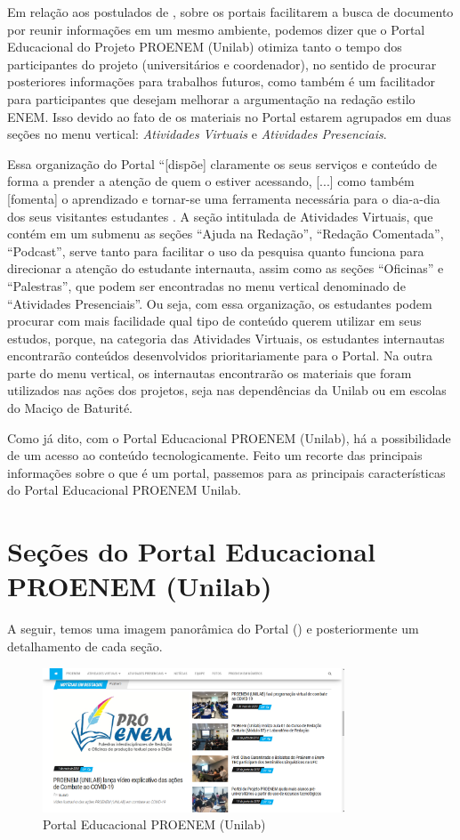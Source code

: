 \documentclass{textolivre}
\begin{document}
Em relação aos postulados de \textcite{bottentuitjunior2013}, sobre os portais facilitarem a busca de documento por reunir informações em um mesmo ambiente, podemos dizer que o Portal Educacional do Projeto PROENEM (Unilab) otimiza tanto o tempo dos participantes do projeto (universitários e coordenador), no sentido de procurar posteriores informações para trabalhos futuros, como também é um facilitador para participantes que desejam melhorar a argumentação na redação estilo ENEM. Isso devido ao fato de os materiais no Portal estarem agrupados em duas seções no menu vertical: \emph{Atividades Virtuais} e \emph{Atividades Presenciais}.

Essa organização do Portal “[dispõe] claramente os seus serviços e conteúdo de forma a prender a atenção de quem o estiver acessando, [...] como também [fomenta] o aprendizado e tornar-se uma ferramenta necessária para o dia-a-dia dos seus visitantes estudantes \cite[p. 67, adaptada]{iahn2001}. A seção intitulada de Atividades Virtuais, que contém em um submenu as seções “Ajuda na Redação”, “Redação Comentada”, “Podcast”, serve tanto para facilitar o uso da pesquisa quanto funciona para direcionar a atenção do estudante internauta, assim como as seções “Oficinas” e “Palestras”, que podem ser encontradas no menu vertical denominado de “Atividades Presenciais”. Ou seja, com essa organização, os estudantes podem procurar com mais facilidade qual tipo de conteúdo querem utilizar em seus estudos, porque, na categoria das Atividades Virtuais, os estudantes internautas encontrarão conteúdos desenvolvidos prioritariamente para o Portal. Na outra parte do menu vertical, os internautas encontrarão os materiais que foram utilizados nas ações dos projetos, seja nas dependências da Unilab ou em escolas do Maciço de Baturité. 

Como já dito, com o Portal Educacional PROENEM (Unilab), há a possibilidade de um acesso ao conteúdo tecnologicamente. Feito um recorte das principais informações sobre o que é um portal, passemos para as principais características do Portal Educacional PROENEM Unilab.

\section{Seções do Portal Educacional PROENEM (Unilab)}
A seguir, temos uma imagem panorâmica do Portal () e posteriormente um detalhamento de cada seção.

\begin{figure}[htbp]
 \centering
 \includegraphics[width=0.8\textwidth]{fig1-33162.png}
 \caption{Portal Educacional PROENEM (Unilab)}
 \label{fig1}
\end{figure}
\end{document}
